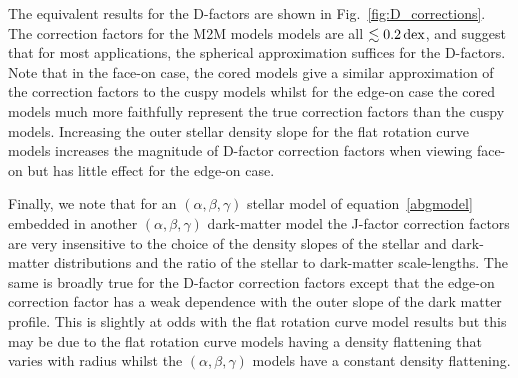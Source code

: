 \documentclass[prd,twocolumn,showpacs,preprintnumbers,superscriptaddress,nofootinbib,amsmath,amssymb,nobalancelastpage]{revtex4}
\def\dex{\,{\rm dex}}
\begin{document}
The equivalent results for the D-factors are shown in
Fig.~\ref{fig:D_corrections}. The correction factors for the M2M models
models are all $\lesssim0.2\dex$, and suggest that for most applications, the spherical
approximation suffices for the D-factors. Note that in the face-on case, the cored models give a similar approximation of the correction factors to the cuspy models whilst for the edge-on case the cored models much more faithfully represent the true correction factors than the cuspy models. Increasing the outer stellar density slope for the flat rotation curve models increases the magnitude of D-factor correction factors when viewing face-on but has little effect for the edge-on case.

Finally, we note that for an $(\alpha,\beta,\gamma)$ stellar model of equation~\eqref{abgmodel} embedded in another $(\alpha,\beta,\gamma)$ dark-matter model the J-factor correction factors are very insensitive to the choice of the density slopes of the stellar and dark-matter distributions and the ratio of the stellar to dark-matter scale-lengths. The same is broadly true for the D-factor correction factors except that the edge-on correction factor has a weak dependence with the outer slope of the dark matter profile. This is slightly at odds with the flat rotation curve model results but this may be due to the flat rotation curve models having a density flattening that varies with radius whilst the $(\alpha,\beta,\gamma)$ models have a constant density flattening.
\end{document}
